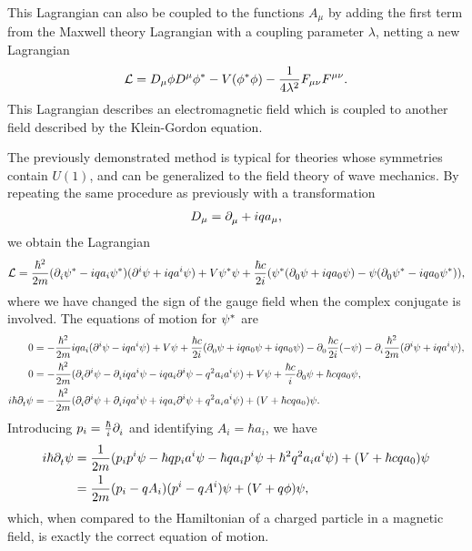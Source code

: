This Lagrangian can also be coupled to the functions $A_{\mu}$ by adding the first term from the Maxwell theory Lagrangian with a coupling parameter $\lambda$, netting a new Lagrangian
\begin{align*}
	\lag = D_{\mu}\phi D^{\mu}\cc{\phi} - V(\cc{\phi}\phi) - \frac{1}{4\lambda^{2}}F_{\mu\nu}F^{\mu\nu}.
\end{align*}
This Lagrangian describes an electromagnetic field which is coupled to another field described by the Klein-Gordon equation.

The previously demonstrated method is typical for theories whose symmetries contain $U(1)$, and can be generalized to the field theory of wave mechanics. By repeating the same procedure as previously with a transformation
\begin{align*}
	D_{\mu} = \del{\mu}{} + iqa_{\mu},
\end{align*}
we obtain the Lagrangian
\begin{align*}
	\lag = \frac{\hbar^{2}}{2m}(\del{i}{\cc{\psi}} - iqa_{i}\cc{\psi})(\del[i]{}{\psi} + iqa^{i}\psi) + V\cc{\psi}\psi + \frac{\hbar c}{2i}(\cc{\psi}(\del{0}{\psi} + iqa_{0}\psi) - \psi(\del{0}{\cc{\psi}} - iqa_{0}\cc{\psi})),
\end{align*}
where we have changed the sign of the gauge field when the complex conjugate is involved. The equations of motion for $\cc{\psi}$ are
\begin{align*}
	0 &= -\frac{\hbar^{2}}{2m}iqa_{i}(\del[i]{}{\psi} - iqa^{i}\psi) + V\psi + \frac{\hbar c}{2i}(\del{0}{\psi} + iqa_{0}\psi + iqa_{0}\psi) - \del{0}{\frac{\hbar c}{2i}( - \psi)} - \del{i}{\frac{\hbar^{2}}{2m}(\del[i]{}{\psi} + iqa^{i}\psi)}, \\
	0 &= -\frac{\hbar^{2}}{2m}(\del{i}{\del[i]{}{\psi}} - \del{i}{iqa^{i}\psi} - iqa_{i}\del[i]{}{\psi} - q^{2}a_{i}a^{i}\psi) + V\psi + \frac{\hbar c}{i}\del{0}{\psi} + \hbar cqa_{0}\psi, \\
	i\hbar\del{t}{\psi} &= -\frac{\hbar^{2}}{2m}(\del{i}{\del[i]{}{\psi}} + \del{i}{iqa^{i}\psi} + iqa_{i}\del[i]{}{\psi} + q^{2}a_{i}a^{i}\psi) + (V + \hbar cqa_{0})\psi.
\end{align*}
Introducing $p_{i} = \frac{\hbar}{i}\del{i}{}$ and identifying $A_{i} = \hbar a_{i}$, we have
\begin{align*}
	i\hbar\del{t}{\psi} &= \frac{1}{2m}(p_{i}p^{i}\psi - \hbar qp_{i}a^{i}\psi - \hbar qa_{i}p^{i}\psi + \hbar^{2}q^{2}a_{i}a^{i}\psi) + (V + \hbar cqa_{0})\psi \\
	                    &= \frac{1}{2m}(p_{i} - qA_{i})(p^{i} - qA^{i})\psi + (V + q\phi)\psi,
\end{align*}
which, when compared to the Hamiltonian of a charged particle in a magnetic field, is exactly the correct equation of motion.

